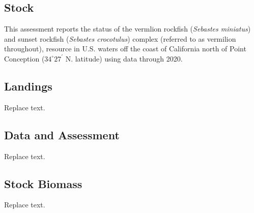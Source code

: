\documentclass[11pt,
  english,
  a4paper,
]{article}
\begin{document}

\hypertarget{stock}{%
\subsection*{Stock}\label{stock}}

\leavevmode\tagmcend\tagstructend

This assessment reports the status of the vermlion rockfish (\emph{Sebastes miniatus}) and sunset rockfish (\emph{Sebastes crocotulus}) complex (referred to as vermilion throughout), resource in U.S. waters off the coast of California north of Point Conception ({\(34^\circ 27^\prime\)\leavevmode\tagmcend\tagstructend} N. latitude) using data through 2020.


\hypertarget{landings}{%
\subsection*{Landings}\label{landings}}

\leavevmode\tagmcend\tagstructend

Replace text.


\hypertarget{data-and-assessment}{%
\subsection*{Data and Assessment}\label{data-and-assessment}}

\leavevmode\tagmcend\tagstructend

Replace text.


\hypertarget{stock-biomass}{%
\subsection*{Stock Biomass}\label{stock-biomass}}

\leavevmode\tagmcend\tagstructend

Replace text.

\end{document}
